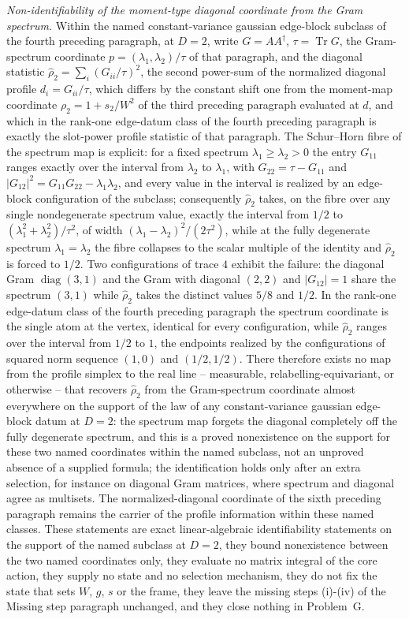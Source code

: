 \emph{Non-identifiability of the moment-type diagonal coordinate from the Gram spectrum.} Within the named constant-variance gaussian edge-block subclass of the fourth preceding paragraph, at \(D=2\), write \(G=AA^{\dagger}\), \(\tau=\operatorname{Tr}G\), the Gram-spectrum coordinate \(p=(\lambda_{1},\lambda_{2})/\tau\) of that paragraph, and the diagonal statistic \(\hat\rho_{2}=\sum_{i}(G_{ii}/\tau)^{2}\), the second power-sum of the normalized diagonal profile \(d_{i}=G_{ii}/\tau\), which differs by the constant shift one from the moment-map coordinate \(\rho_{2}=1+s_{2}/W^{2}\) of the third preceding paragraph evaluated at \(d\), and which in the rank-one edge-datum class of the fourth preceding paragraph is exactly the slot-power profile statistic of that paragraph. The Schur--Horn fibre of the spectrum map is explicit: for a fixed spectrum \(\lambda_{1}\ge\lambda_{2}>0\) the entry \(G_{11}\) ranges exactly over the interval from \(\lambda_{2}\) to \(\lambda_{1}\), with \(G_{22}=\tau-G_{11}\) and \(\lvert G_{12}\rvert^{2}=G_{11}G_{22}-\lambda_{1}\lambda_{2}\), and every value in the interval is realized by an edge-block configuration of the subclass; consequently \(\hat\rho_{2}\) takes, on the fibre over any single nondegenerate spectrum value, exactly the interval from \(1/2\) to \((\lambda_{1}^{2}+\lambda_{2}^{2})/\tau^{2}\), of width \((\lambda_{1}-\lambda_{2})^{2}/(2\tau^{2})\), while at the fully degenerate spectrum \(\lambda_{1}=\lambda_{2}\) the fibre collapses to the scalar multiple of the identity and \(\hat\rho_{2}\) is forced to \(1/2\). Two configurations of trace \(4\) exhibit the failure: the diagonal Gram \(\operatorname{diag}(3,1)\) and the Gram with diagonal \((2,2)\) and \(\lvert G_{12}\rvert=1\) share the spectrum \((3,1)\) while \(\hat\rho_{2}\) takes the distinct values \(5/8\) and \(1/2\). In the rank-one edge-datum class of the fourth preceding paragraph the spectrum coordinate is the single atom at the vertex, identical for every configuration, while \(\hat\rho_{2}\) ranges over the interval from \(1/2\) to \(1\), the endpoints realized by the configurations of squared norm sequence \((1,0)\) and \((1/2,1/2)\). There therefore exists no map from the profile simplex to the real line -- measurable, relabelling-equivariant, or otherwise -- that recovers \(\hat\rho_{2}\) from the Gram-spectrum coordinate almost everywhere on the support of the law of any constant-variance gaussian edge-block datum at \(D=2\): the spectrum map forgets the diagonal completely off the fully degenerate spectrum, and this is a proved nonexistence on the support for these two named coordinates within the named subclass, not an unproved absence of a supplied formula; the identification holds only after an extra selection, for instance on diagonal Gram matrices, where spectrum and diagonal agree as multisets. The normalized-diagonal coordinate of the sixth preceding paragraph remains the carrier of the profile information within these named classes. These statements are exact linear-algebraic identifiability statements on the support of the named subclass at \(D=2\), they bound nonexistence between the two named coordinates only, they evaluate no matrix integral of the core action, they supply no state and no selection mechanism, they do not fix the state that sets \(W\), \(g\), \(s\) or the frame, they leave the missing steps (i)-(iv) of the Missing step paragraph unchanged, and they close nothing in Problem~G.
